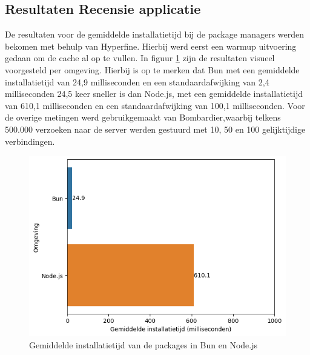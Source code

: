 \subsection{Resultaten Recensie applicatie}
De resultaten voor de gemiddelde installatietijd bij de package managers werden bekomen met behulp van Hyperfine.
Hierbij werd eerst een warmup uitvoering gedaan om de cache al op te vullen.
In figuur \ref{fig:installatietijdapp} zijn de resultaten visueel voorgesteld per omgeving.
Hierbij is op te merken dat Bun met een gemiddelde installatietijd van 24,9 milliseconden en een standaardafwijking van 2,4 milliseconden 24,5 keer sneller 
is dan Node.js, met een gemiddelde installatietijd van 610,1 milliseconden en een standaardafwijking van 100,1 milliseconden.
Voor de overige metingen werd gebruikgemaakt van Bombardier,waarbij
telkens 500.000 verzoeken naar de server werden gestuurd met 10, 50 en 100 gelijktijdige verbindingen.
\begin{figure}[H]
  \centering
  \includegraphics{graphics/install.png}
  \caption[Gemiddelde Installatietijd]{\label{fig:installatietijdapp}Gemiddelde installatietijd van de packages in Bun en Node.js}
\end{figure}



